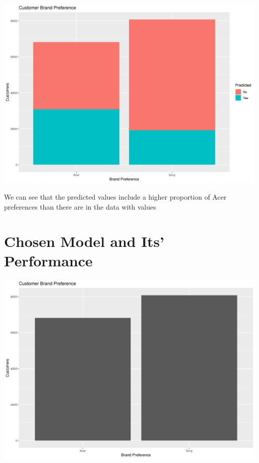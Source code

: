 \documentclass[12pt,a4paper,leqno]{report}
\theoremstyle{plain}
\theoremstyle{definition}
\theoremstyle{remark}
\begin{document}
\bigskip
{
    \centering
    \includegraphics[width=\textwidth,height=\textheight,keepaspectratio]{brand_preference_marked.png}
    \par
}
\bigskip

We can see that the predicted values include a higher proportion of Acer preferences than there are in the data with values

\section{Chosen Model and Its' Performance}


\bigskip
{
    \centering
    \includegraphics[width=\textwidth,height=\textheight,keepaspectratio]{brand_preference_plain.png}
    \par
}
\bigskip
\end{document}
